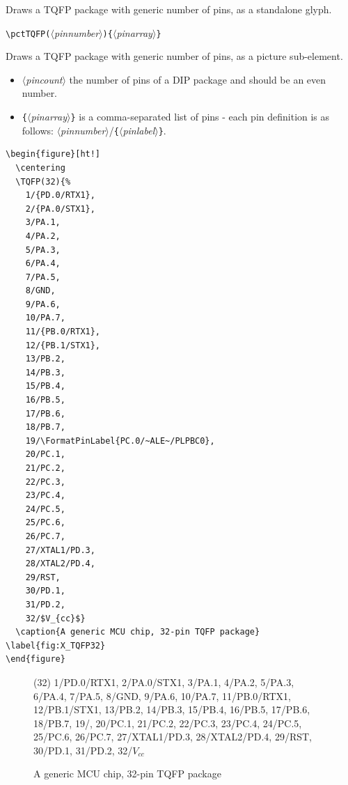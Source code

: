 \documentclass[english,a4paper,10pt]{article}
\newcommand\argu[1]{$\langle$\textit{#1}$\rangle$}
\newcommand\ARGU[1]{\texttt{\{}\argu{#1}\texttt{\}}}
\newcommand\arguD[1]{\texttt{(}\argu{#1}\texttt{)}}
\newcommand\verbinline{\lstinline[basicstyle=\normalsize\ttfamily]}
\begin{document}
Draws a TQFP package with generic number of pins, as a standalone glyph.

\verbinline|\pctTQFP|\arguD{pinnumber}\ARGU{pinarray}
\smallskip

Draws a TQFP package with generic number of pins, as a picture sub-element.

\begin{itemize}
	\item \argu{pincount} the  number of pins of a DIP package and should be an even number.
	\item \ARGU{pinarray} is a comma-separated list of pins  - each pin definition is as follows: \argu{pinnumber}/\ARGU{pinlabel}.
\end{itemize}

\begin{minipage}[t]{0.65\linewidth}
\begin{lstlisting}
\begin{figure}[ht!]
  \centering
  \TQFP(32){%
  	1/{PD.0/RTX1},
  	2/{PA.0/STX1},
  	3/PA.1,										
  	4/PA.2,										
  	5/PA.3,										
  	6/PA.4,										
  	7/PA.5,										
  	8/GND,									
  	9/PA.6,
  	10/PA.7,
  	11/{PB.0/RTX1},
  	12/{PB.1/STX1},
  	13/PB.2,										
  	14/PB.3,										
  	15/PB.4,										
  	16/PB.5,										
  	17/PB.6,										
  	18/PB.7,										
  	19/\FormatPinLabel{PC.0/~ALE~/PLPBC0},
  	20/PC.1,										
  	21/PC.2,										
  	22/PC.3,										
  	23/PC.4,										
  	24/PC.5,										
  	25/PC.6,									
  	26/PC.7,
  	27/XTAL1/PD.3,
  	28/XTAL2/PD.4,
  	29/RST,
  	30/PD.1,										
  	31/PD.2,										
  	32/$V_{cc}$}								
  \caption{A generic MCU chip, 32-pin TQFP package} \label{fig:X_TQFP32}
\end{figure}
\end{lstlisting}%
\end{minipage}\hfill

\begin{figure}[ht!]
  \centering
  \TQFP(32){%
  	1/{PD.0/RTX1},
  	2/{PA.0/STX1},
  	3/PA.1,										
  	4/PA.2,										
  	5/PA.3,										
  	6/PA.4,										
  	7/PA.5,										
  	8/GND,									
  	9/PA.6,										
  	10/PA.7,										
  	11/{PB.0/RTX1},
  	12/{PB.1/STX1},
  	13/PB.2,
  	14/PB.3,
  	15/PB.4,
  	16/PB.5,
  	17/PB.6,
  	18/PB.7,
  	19/,
  	20/PC.1,
  	21/PC.2,
  	22/PC.3,
  	23/PC.4,
  	24/PC.5,
  	25/PC.6,
  	26/PC.7,
  	27/XTAL1/PD.3,
  	28/XTAL2/PD.4,
  	29/RST,
  	30/PD.1,
  	31/PD.2,
  	32/$V_{cc}$}
  \caption{A generic MCU chip, 32-pin TQFP package} \label{fig:X_TQFP32}
\end{figure}
\end{document}
